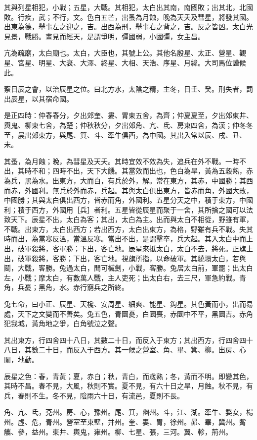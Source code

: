 \documentclass[10pt,fontset=adobe,UTF8,twoside]{ctexrep}
\begin{document}
其與列星相犯，小戰；五星，大戰。其相犯，太白出其南，南國敗；出其北，北國敗。行疾，武；不行，文。色白五芒，出蚤為月蝕，晚為天夭及彗星，將發其國。出東為德，舉事左之迎之，吉。出西為刑，舉事右之背之，吉。反之皆凶。太白光見景，戰勝。晝見而經天，是謂爭明，彊國弱，小國彊，女主昌。

亢為疏廟，太白廟也。太白，大臣也，其號上公。其他名殷星、太正、營星、觀星、宮星、明星、大衰、大澤、終星、大相、天浩、序星、月緯。大司馬位謹候此。

察日辰之會，以治辰星之位。曰北方水，太陰之精，主冬，日壬、癸。刑失者，罰出辰星，以其宿命國。

是正四時：仲春春分，夕出郊奎、婁、胃東五舍，為齊；仲夏夏至，夕出郊東井、輿鬼、柳東七舍，為楚；仲秋秋分，夕出郊角、亢、氐、房東四舍，為漢；仲冬冬至，晨出郊東方，與尾、箕、斗、牽牛俱西，為中國。其出入常以辰、戌、丑、未。

其蚤，為月蝕；晚，為彗星及天夭。其時宜效不效為失，追兵在外不戰。一時不出，其時不和；四時不出，天下大饑。其當效而出也，色白為旱，黃為五穀熟，赤為兵，黑為水。出東方，大而白，有兵於外，解。常在東方，其赤，中國勝；其西而赤，外國利。無兵於外而赤，兵起。其與太白俱出東方，皆赤而角，外國大敗，中國勝；其與太白俱出西方，皆赤而角，外國利。五星分天之中，積于東方，中國利；積于西方，外國用［兵］者利。五星皆從辰星而聚于一舍，其所捨之國可以法致天下。辰星不出，太白為客；其出，太白為主。出而與太白不相從，野雖有軍，不戰。出東方，太白出西方；若出西方，太白出東方，為格，野雖有兵不戰。失其時而出，為當寒反溫，當溫反寒。當出不出，是謂擊卒，兵大起。其入太白中而上出，破軍殺將，客軍勝；下出，客亡地。辰星來抵太白，太白不去，將死。正旗上出，破軍殺將，客勝；下出，客亡地。視旗所指，以命破軍。其繞環太白，若與鬬，大戰，客勝。兔過太白，閒可椷劍，小戰，客勝。兔居太白前，軍罷；出太白左，小戰；摩太白，有數萬人戰，主人吏死；出太白右，去三尺，軍急約戰。青角，兵憂；黑角，水。赤行窮兵之所終。

兔七命，曰小正、辰星、天欃、安周星、細爽、能星、鉤星。其色黃而小，出而易處，天下之文變而不善矣。兔五色，青圜憂，白圜喪，赤圜中不平，黑圜吉。赤角犯我城，黃角地之爭，白角號泣之聲。

其出東方，行四舍四十八日，其數二十日，而反入于東方；其出西方，行四舍四十八日，其數二十日，而反入于西方。其一候之營室、角、畢、箕、柳。出房、心閒，地動。

辰星之色：春，青黃；夏，赤白；秋，青白，而歲熟；冬，黃而不明。即變其色，其時不昌。春不見，大風，秋則不實。夏不見，有六十日之旱，月蝕。秋不見，有兵，春則不生。冬不見，陰雨六十日，有流邑，夏則不長。

角、亢、氐，兗州。房、心，豫州。尾、箕，幽州。斗，江、湖。牽牛、婺女，楊州。虛、危，青州。營室至東壁，并州。奎、婁、胃，徐州。昴、畢，冀州。觜觿、參，益州。東井、輿鬼，雍州。柳、七星、張，三河。翼、軫，荊州。
\end{document}
